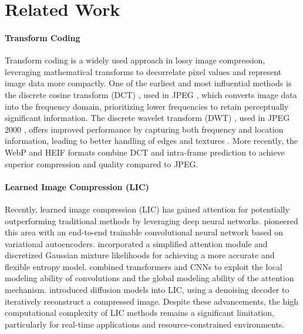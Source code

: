 \section{Related Work} \label{sec:related_work}

\paragraph{Transform Coding}
Transform coding is a widely used approach in lossy image compression, leveraging mathematical transforms to decorrelate pixel values and represent image data more compactly. One of the earliest and most influential methods is the discrete cosine transform (DCT) \cite{ahmed1974discrete}, used in JPEG \cite{wallace1991jpeg}, which converts image data into the frequency domain, prioritizing lower frequencies to retain perceptually significant information. The discrete wavelet transform (DWT) \cite{antonini1992image}, used in JPEG 2000 \cite{skodras2001jpeg}, offers improved performance by capturing both frequency and location information, leading to better handling of edges and textures \cite{shapiro1993embedded}. More recently, the WebP \cite{google2011webp} and HEIF \cite{lainema2016hevc, hannuksela2015high} formats combine DCT and intra-frame prediction to achieve superior compression and quality compared to JPEG.

\paragraph{Learned Image Compression (LIC)}
Recently, learned image compression (LIC) has gained attention for potentially outperforming traditional methods by leveraging deep neural networks. \citet{balle2018variational} pioneered this area with an end-to-end trainable convolutional neural network based on variational autoencoders. \citet{cheng2020learned} incorporated a simplified attention module and discretized Gaussian mixture likelihoods for achieving a more accurate and flexible entropy model. \citet{liu2023learned} combined transformers and CNNs to exploit the local modeling ability of convolutions and the global modeling ability of the attention mechanism. \citet{yang2024lossy} introduced diffusion models into LIC, using a denoising decoder to iteratively reconstruct a compressed image. Despite these advancements, the high computational complexity of LIC methods remains a significant limitation, particularly for real-time applications and resource-constrained environments.

